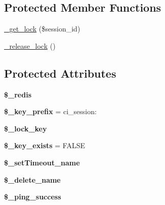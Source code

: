 \subsection*{Protected Member Functions}
\begin{DoxyCompactItemize}
\item 
\mbox{\hyperlink{class_c_i___session__redis__driver_a889facb2bb5293b10071ae09c64ef27a}{\+\_\+get\+\_\+lock}} (\$session\+\_\+id)
\item 
\mbox{\hyperlink{class_c_i___session__redis__driver_adf871335e5536b19b146185a92aff310}{\+\_\+release\+\_\+lock}} ()
\end{DoxyCompactItemize}
\subsection*{Protected Attributes}
\begin{DoxyCompactItemize}
\item 
\mbox{\label{class_c_i___session__redis__driver_a287fc596cde9d48a9039ffc913a3ec4a}} 
{\bfseries \$\+\_\+redis}
\item 
\mbox{\label{class_c_i___session__redis__driver_acb855d57edc6becdd1bc384885ddfdfb}} 
{\bfseries \$\+\_\+key\+\_\+prefix} = \textquotesingle{}ci\+\_\+session\+:\textquotesingle{}
\item 
\mbox{\label{class_c_i___session__redis__driver_aae014d8bd9a9866994c6c0d587e869a3}} 
{\bfseries \$\+\_\+lock\+\_\+key}
\item 
\mbox{\label{class_c_i___session__redis__driver_a300f7c19ff77ba3a96d14b68060ecaef}} 
{\bfseries \$\+\_\+key\+\_\+exists} = F\+A\+L\+SE
\item 
\mbox{\label{class_c_i___session__redis__driver_a9dc50b0541ff442ca804d94c4feb301b}} 
{\bfseries \$\+\_\+set\+Timeout\+\_\+name}
\item 
\mbox{\label{class_c_i___session__redis__driver_a80a6b56e3f5b98a67b8ec202f9baacb9}} 
{\bfseries \$\+\_\+delete\+\_\+name}
\item 
\mbox{\label{class_c_i___session__redis__driver_a3de1c600218f1228d02ad7a8e3744b0c}} 
{\bfseries \$\+\_\+ping\+\_\+success}
\end{DoxyCompactItemize}
